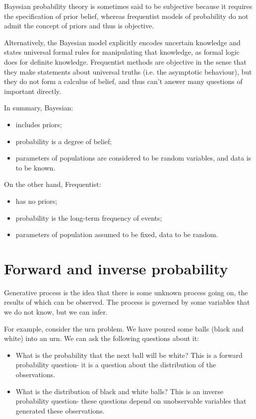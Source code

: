 \documentclass[a4paper, openany]{memoir}
\begin{document}
Bayesian probability theory is sometimes said to be subjective because it requires the specification of prior belief, whereas frequentist models of probability do not admit the concept of priors and thus is objective.

Alternatively, the Bayesian model explicitly encodes uncertain knowledge and states universal formal rules for manipulating that knowledge, as formal logic does for definite knowledge. Frequentist methods are objective in the sense that they make statements about universal truths (i.e. the asymptotic behaviour), but they do not form a calculus of belief, and thus can't answer many questions of important directly.

In summary, Bayesian:
\begin{itemize}
    \item includes priors;
    \item probability is a degree of belief;
    \item parameters of populations are considered to be random variables, and data is to be known.
\end{itemize}
On the other hand, Frequentist:
\begin{itemize}
    \item has no priors;
    \item probability is the long-term frequency of events;
    \item parameters of population assumed to be fixed, data to be random.
\end{itemize}

\section{Forward and inverse probability}
Generative process is the idea that there is some unknown process going on, the results of which can be observed. The process is governed by some variables that we do not know, but we can infer.

For example, consider the urn problem. We have poured some balls (black and white) into an urn. We can ask the following questions about it:
\begin{itemize}
    \item What is the probability that the next ball will be white? This is a forward probability question- it is a question about the distribution of the observations.
    \item What is the distribution of black and white balls? This is an inverse probability question- these questions depend on unobservable variables that generated these observations.
\end{itemize}
\end{document}
